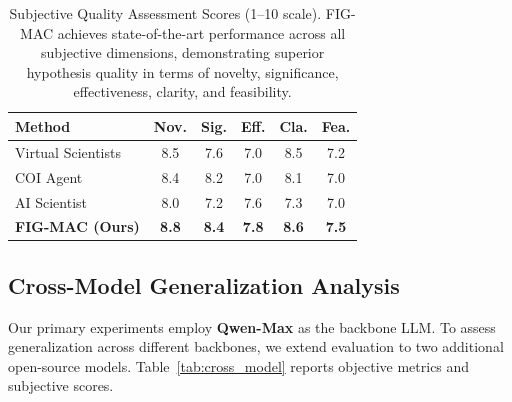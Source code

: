 \documentclass[runningheads]{llncs}
\begin{document}
\begin{table}[t]
\centering
\small
\setlength{\tabcolsep}{4pt}
\begin{tabular}{lccccc}
\toprule
\textbf{Method} & \textbf{Nov.} & \textbf{Sig.} & \textbf{Eff.} & \textbf{Cla.} & \textbf{Fea.} \\
\midrule
Virtual Scientists & 8.5 & 7.6 & 7.0 & 8.5 & 7.2 \\
COI Agent & 8.4 & 8.2 & 7.0 & 8.1 & 7.0 \\
AI Scientist & 8.0 & 7.2 & 7.6 & 7.3 & 7.0 \\
\midrule
\textbf{FIG-MAC (Ours)} & \textbf{8.8} & \textbf{8.4} & \textbf{7.8} & \textbf{8.6} & \textbf{7.5} \\
\bottomrule
\end{tabular}
\caption{Subjective Quality Assessment Scores (1--10 scale). FIG-MAC achieves state-of-the-art performance across all subjective dimensions, demonstrating superior hypothesis quality in terms of novelty, significance, effectiveness, clarity, and feasibility.}
\label{tab:subjective_quality}
\end{table}


\subsection{Cross-Model Generalization Analysis}
\label{sec:cross_model}

Our primary experiments employ \textbf{Qwen-Max} as the backbone LLM. To assess generalization across different backbones, we extend evaluation to two additional open-source models. Table~\ref{tab:cross_model} reports objective metrics and subjective scores.
\end{document}
